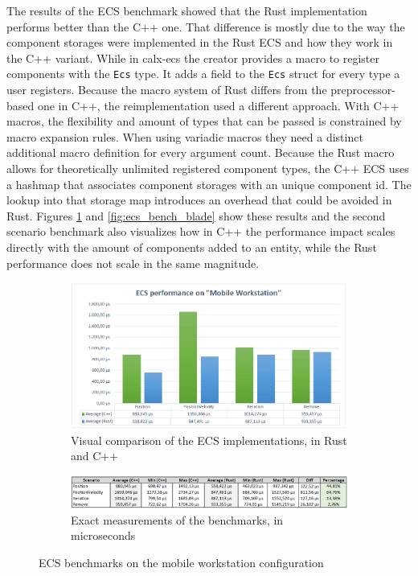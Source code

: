 The results of the \ac{ECS} benchmark showed that the Rust implementation performs better than the C++ one. That difference is mostly due to the way the component storages were implemented in the Rust \ac{ECS} and how they work in the C++ variant. While in calx-ecs the creator provides a macro to register components with the \texttt{Ecs} type. It adds a field to the \texttt{Ecs} struct for every type a user registers. Because the macro system of Rust differs from the preprocessor-based one in C++, the reimplementation used a different approach. With C++ macros, the flexibility and amount of types that can be passed is constrained by macro expansion rules. When using variadic macros they need a distinct additional macro definition for every argument count. Because the Rust macro allows for theoretically unlimited registered component types, the C++ \ac{ECS} uses a hashmap that associates component storages with an unique component id. The lookup into that storage map introduces an overhead that could be avoided in Rust. Figures \ref{fig:ecs_bench_work} and \ref{fig:ecs_bench_blade} show these results and the second scenario benchmark also visualizes how in C++ the performance impact scales directly with the amount of components added to an entity, while the Rust performance does not scale in the same magnitude. 

\begin{figure}[h!]
	\centering
	\begin{subfigure}[b]{\textwidth}
		\includegraphics[width=1\linewidth]{PICs/ecs_bench_workstation.png}
		\caption{Visual comparison of the \ac{ECS} implementations, in Rust and C++}
		\label{fig:ecs_bench_work} 
	\end{subfigure}
	
	\begin{subfigure}[b]{\textwidth}
		\includegraphics[width=1\linewidth]{PICs/ecs_bench_workstation_data.png}
		\caption{Exact measurements of the benchmarks, in microseconds}
		\label{fig:ecs_bench_work_data}
	\end{subfigure}
	
	\caption[ECS benchmarks workstation]{\ac{ECS} benchmarks on the mobile workstation configuration}
\end{figure}

